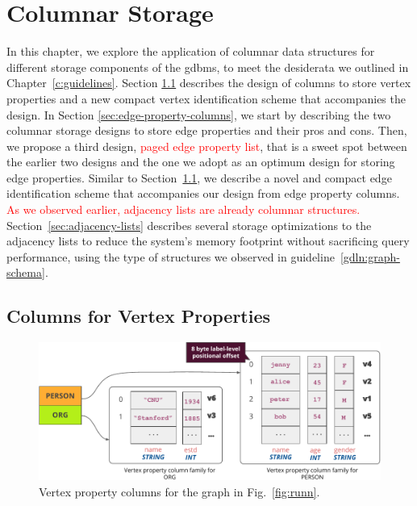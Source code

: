 \chapter{Columnar Storage}
\label{c:columnar-storage}

In this chapter, we explore the application of columnar data structures for different storage components of the \gls{gdbms}, to meet the desiderata we outlined in Chapter~\ref{c:guidelines}. Section \ref{sec:vertex-property-columns} describes the design of columns to store vertex properties and a new compact vertex identification scheme that accompanies the design. In Section \ref{sec:edge-property-columns}, we start by describing the two columnar storage designs to store edge properties and their pros and cons. Then, we propose a third design, \textcolor{red}{paged edge property list}, that is a sweet spot between the earlier two designs and the one we adopt as an optimum design for storing edge properties. Similar to Section~\ref{sec:vertex-property-columns}, we describe a novel and compact edge identification scheme that accompanies our design from edge property columns. \textcolor{red}{As we observed earlier, adjacency lists are already columnar structures.} Section~\ref{sec:adjacency-lists} describes several storage optimizations to the adjacency lists to reduce the system's memory footprint without sacrificing query performance, using the type of structures we observed in guideline~\ref{gdln:graph-schema}.

\section{Columns for Vertex Properties}
\label{sec:vertex-property-columns}

\begin{figure}
	\vspace{-15pt}
	\hfill\includegraphics[scale=0.85]{img/vpcols}\hspace*{\fill}
	\caption{Vertex property columns for the graph in Fig.~\ref{fig:runn}.}
	\label{fig:vpcols}
	\vspace{-8pt}
\end{figure}


